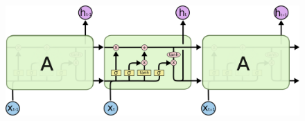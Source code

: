 \begin{center}
	\begin{figure}[H]
		\centering
		\includegraphics[width=1\columnwidth]{images/chap3/lstm-chain.png}
		\label{chap3:lstm-chain}
	\end{figure}
\end{center}

